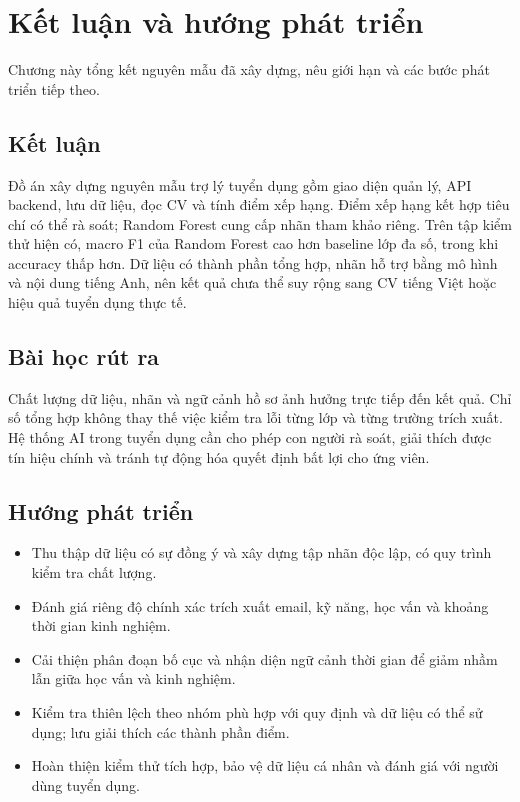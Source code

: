 \chapter{Kết luận và hướng phát triển}
\label{ch:ketluan}

\begin{muctieu}
Chương này tổng kết nguyên mẫu đã xây dựng, nêu giới hạn và các bước phát triển tiếp theo.
\end{muctieu}

\section{Kết luận}
Đồ án xây dựng nguyên mẫu trợ lý tuyển dụng gồm giao diện quản lý, API backend, lưu dữ liệu, đọc CV và tính điểm xếp hạng. Điểm xếp hạng kết hợp tiêu chí có thể rà soát; Random Forest cung cấp nhãn tham khảo riêng. Trên tập kiểm thử hiện có, macro F1 của Random Forest cao hơn baseline lớp đa số, trong khi accuracy thấp hơn. Dữ liệu có thành phần tổng hợp, nhãn hỗ trợ bằng mô hình và nội dung tiếng Anh, nên kết quả chưa thể suy rộng sang CV tiếng Việt hoặc hiệu quả tuyển dụng thực tế.

\section{Bài học rút ra}
Chất lượng dữ liệu, nhãn và ngữ cảnh hồ sơ ảnh hưởng trực tiếp đến kết quả. Chỉ số tổng hợp không thay thế việc kiểm tra lỗi từng lớp và từng trường trích xuất. Hệ thống AI trong tuyển dụng cần cho phép con người rà soát, giải thích được tín hiệu chính và tránh tự động hóa quyết định bất lợi cho ứng viên.

\section{Hướng phát triển}
\begin{itemize}[leftmargin=1.6em,itemsep=2pt]
  \item Thu thập dữ liệu có sự đồng ý và xây dựng tập nhãn độc lập, có quy trình kiểm tra chất lượng.
  \item Đánh giá riêng độ chính xác trích xuất email, kỹ năng, học vấn và khoảng thời gian kinh nghiệm.
  \item Cải thiện phân đoạn bố cục và nhận diện ngữ cảnh thời gian để giảm nhầm lẫn giữa học vấn và kinh nghiệm.
  \item Kiểm tra thiên lệch theo nhóm phù hợp với quy định và dữ liệu có thể sử dụng; lưu giải thích các thành phần điểm.
  \item Hoàn thiện kiểm thử tích hợp, bảo vệ dữ liệu cá nhân và đánh giá với người dùng tuyển dụng.
\end{itemize}
